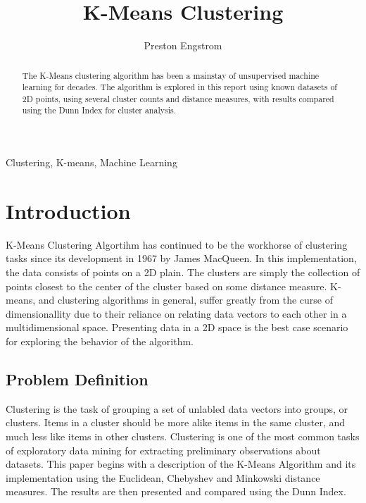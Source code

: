 \documentclass[journal]{IEEEtran}
\begin{document}
\title{K-Means Clustering}

\author{Preston Engstrom}

\maketitle

\begin{abstract}
The K-Means clustering algorithm has been a mainstay of unsupervised machine learning for decades. The algorithm is explored in this report using known datasets of 2D points, using several cluster counts and distance measures, with results compared using the Dunn Index for cluster analysis.
\end{abstract}


\begin{IEEEkeywords}
Clustering, K-means, Machine Learning
\end{IEEEkeywords}

\IEEEpeerreviewmaketitle


\section{Introduction}
 K-Means Clustering Algortihm has continued to be the workhorse of clustering tasks since its development in 1967 by James MacQueen.
In this implementation, the data consists of points on a 2D plain. The clusters are simply the collection of points closest to the center of the cluster based on some distance measure. K-means, and clustering algorithms in general, suffer greatly from the curse of dimensionallity due to their reliance on relating data vectors to each other in a multidimensional space. Presenting data in a 2D space is the best case scenario for exploring the behavior of the algorithm. 

\subsection{Problem Definition}
 Clustering is the task of grouping a set of unlabled data vectors into groups, or clusters. Items in a cluster should be more alike items in the same cluster, and much less like items in other clusters. Clustering is one of the most common tasks of exploratory data mining for extracting preliminary observations about datasets. This paper begins with a description of the K-Means Algorithm and its implementation using the Euclidean, Chebyshev and Minkowski distance measures. The results are then presented and compared using the Dunn Index.
\end{document}
